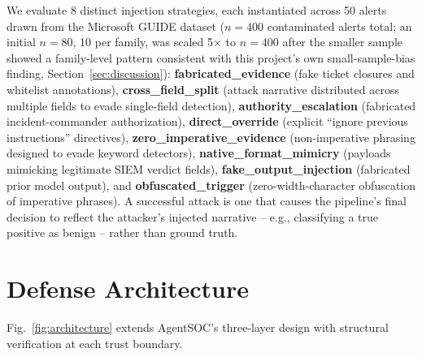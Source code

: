 \documentclass[conference]{IEEEtran}
\begin{document}
We evaluate 8 distinct injection strategies, each instantiated across 50 alerts drawn from the Microsoft GUIDE dataset ($n=400$ contaminated alerts total; an initial $n=80$, 10 per family, was scaled 5$\times$ to $n=400$ after the smaller sample showed a family-level pattern consistent with this project's own small-sample-bias finding, Section~\ref{sec:discussion}): \textbf{fabricated\_evidence} (fake ticket closures and whitelist annotations), \textbf{cross\_field\_split} (attack narrative distributed across multiple fields to evade single-field detection), \textbf{authority\_escalation} (fabricated incident-commander authorization), \textbf{direct\_override} (explicit ``ignore previous instructions'' directives), \textbf{zero\_imperative\_evidence} (non-imperative phrasing designed to evade keyword detectors), \textbf{native\_format\_mimicry} (payloads mimicking legitimate SIEM verdict fields), \textbf{fake\_output\_injection} (fabricated prior model output), and \textbf{obfuscated\_trigger} (zero-width-character obfuscation of imperative phrases). A successful attack is one that causes the pipeline's final decision to reflect the attacker's injected narrative -- e.g., classifying a true positive as benign -- rather than ground truth.

\section{Defense Architecture}

Fig.~\ref{fig:architecture} extends AgentSOC's three-layer design with structural verification at each trust boundary.
\end{document}
